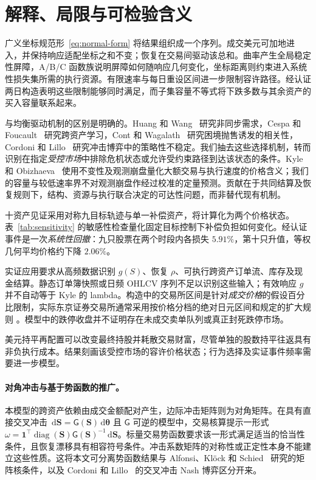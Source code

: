 \documentclass[11pt]{article}
\numberwithin{equation}{section}
\theoremstyle{definition}
\theoremstyle{remark}
\newcommand{\dd}{\,\mathrm{d}}
\newcommand{\one}{\mathbf{1}}
\begin{document}
\section{解释、局限与可检验含义}\label{sec:discussion}
广义坐标规范形~\eqref{eq:normal-form} 将结果组织成一个序列。成交美元可加地进入，并保持响应适配坐标之和不变；恢复在交易间驱动该总和。曲率产生全局稳定性屏障，A/B/C 函数族说明屏障如何随响应几何变化，坐标距离则约束进入系统性损失集所需的执行资源。有限速率与每日重设区间进一步限制容许路径。经认证两日构造表明这些限制能够同时满足，而子集容量不等式将下跌多数与其余资产的买入容量联系起来。

与均衡驱动机制的区别是明确的。Huang 和 Wang~\citep{HuangWang2009} 研究非同步需求，Cespa 和 Foucault~\citep{CespaFoucault2014} 研究跨资产学习，Cont 和 Wagalath~\citep{ContWagalath2013} 研究困境抛售诱发的相关性，Cordoni 和 Lillo~\citep{CordoniLillo2024} 研究冲击博弈中的策略性不稳定。我们抽去这些选择机制，转而识别在指定\emph{受控市场}中排除危机状态或允许受约束路径到达该状态的条件。Kyle 和 Obizhaeva~\citep{KyleObizhaeva2023} 使用不变性及观测崩盘量化大额交易与执行速度的价格含义；我们的容量与较低速率界不对观测崩盘作经过校准的定量预测。贡献在于共同结算及恢复规则下，结构、资源与执行联合决定的可达性问题，而非替代现有机制。

十资产见证采用对称九目标轨迹与单一补偿资产，将计算化为两个价格状态。表~\ref{tab:sensitivity} 的敏感性检查量化固定目标控制下补偿负担如何变化。经认证事件是一次\emph{系统性回撤}：九只股票在两个时段内各损失 $5.91\%$，第十只升值，等权几何平均价格约下降 $2.06\%$。

实证应用要求从高频数据识别 $g(S)$、恢复 $\rho$、可执行跨资产订单流、库存及现金结算。静态订单簿快照或日频 OHLCV 序列不足以识别这些输入；有效响应 $g$ 并不自动等于 Kyle 的 lambda。构造中的交易所区间是针对\emph{成交价格}的假设百分比限制，实际东京证券交易所通常采用按价格分档的绝对日元区间和规定的扩大规则 \citep{JPX2026}。模型中的跌停收盘并不证明存在未成交卖单队列或真正封死跌停市场。

美元持平再配置可以改变最终持股并耗散交易财富，尽管单独的股数持平往返具有非负执行成本。结果刻画该受控市场的容许价格状态；行为选择及实证事件频率需要进一步模型。

\paragraph{对角冲击与基于势函数的推广。}
本模型的跨资产依赖由成交金额配对产生，边际冲击矩阵则为对角矩阵。在具有直接交叉冲击 $\dd\bm S=\mathsf G(\bm S)\dd\bm\theta$ 且 $\mathsf G$ 可逆的模型中，交易核算提示一形式 $\omega=\one^\top\operatorname{diag}(\bm S)\mathsf G(\bm S)^{-1}\dd\bm S$。标量交易势函数要求该一形式满足适当的恰当性条件，且恢复漂移具有相容符号条件。冲击系数矩阵的对称性或正定性本身不能建立这些性质。这将本文可分离势函数结果与 Alfonsi、Kl\"ock 和 Schied~\citep{AlfonsiKlockSchied2016} 研究的矩阵核条件，以及 Cordoni 和 Lillo~\citep{CordoniLillo2024} 的交叉冲击 Nash 博弈区分开来。
\end{document}
